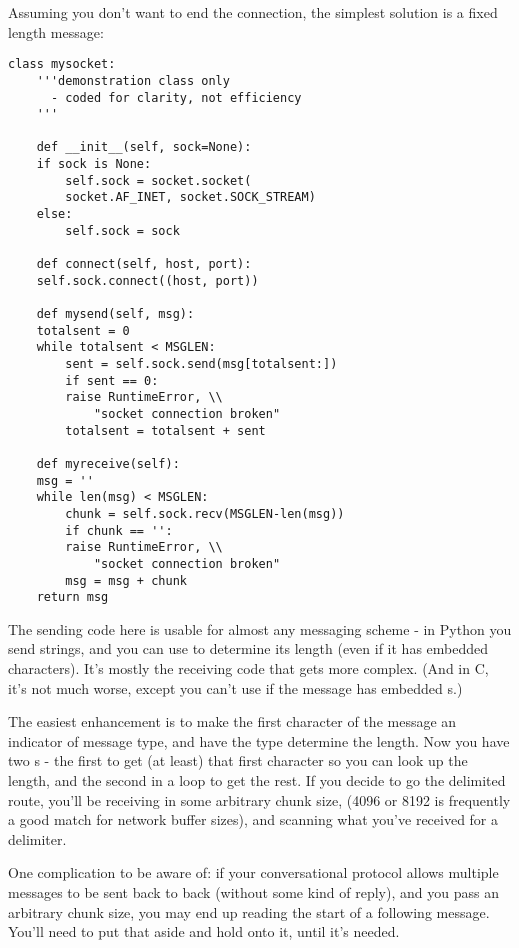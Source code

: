 \documentclass{howto}
\begin{document}
Assuming you don't want to end the connection, the simplest solution
is a fixed length message:

\begin{verbatim}
class mysocket:
    '''demonstration class only 
      - coded for clarity, not efficiency
    '''

    def __init__(self, sock=None):
	if sock is None:
	    self.sock = socket.socket(
		socket.AF_INET, socket.SOCK_STREAM)
	else:
	    self.sock = sock

    def connect(self, host, port):
	self.sock.connect((host, port))

    def mysend(self, msg):
	totalsent = 0
	while totalsent < MSGLEN:
	    sent = self.sock.send(msg[totalsent:])
	    if sent == 0:
		raise RuntimeError, \\
		    "socket connection broken"
	    totalsent = totalsent + sent

    def myreceive(self):
	msg = ''
	while len(msg) < MSGLEN:
	    chunk = self.sock.recv(MSGLEN-len(msg))
	    if chunk == '':
		raise RuntimeError, \\
		    "socket connection broken"
	    msg = msg + chunk
	return msg
\end{verbatim}

The sending code here is usable for almost any messaging scheme - in
Python you send strings, and you can use  to
determine its length (even if it has embedded 
characters). It's mostly the receiving code that gets more
complex. (And in C, it's not much worse, except you can't use
 if the message has embedded s.)

The easiest enhancement is to make the first character of the message
an indicator of message type, and have the type determine the
length. Now you have two s - the first to get (at
least) that first character so you can look up the length, and the
second in a loop to get the rest. If you decide to go the delimited
route, you'll be receiving in some arbitrary chunk size, (4096 or 8192
is frequently a good match for network buffer sizes), and scanning
what you've received for a delimiter.

One complication to be aware of: if your conversational protocol
allows multiple messages to be sent back to back (without some kind of
reply), and you pass  an arbitrary chunk size, you
may end up reading the start of a following message. You'll need to
put that aside and hold onto it, until it's needed.
\end{document}
